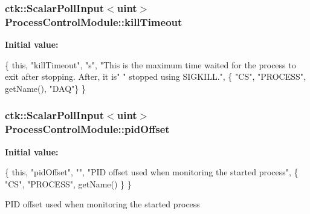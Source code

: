\subsubsection[{\texorpdfstring{kill\+Timeout}{killTimeout}}]{\setlength{\rightskip}{0pt plus 5cm}ctk\+::\+Scalar\+Poll\+Input$<$uint$>$ Process\+Control\+Module\+::kill\+Timeout}\hypertarget{structProcessControlModule_a2e5d8104b93bbd907f61c2e945affb91}{}\label{structProcessControlModule_a2e5d8104b93bbd907f61c2e945affb91}
{\bfseries Initial value\+:}
\begin{DoxyCode}
\{ \textcolor{keyword}{this}, \textcolor{stringliteral}{"killTimeout"}, \textcolor{stringliteral}{"s"}, \textcolor{stringliteral}{"This is the maximum time waited for the process to exit after stopping. After,
       it is"}
        \textcolor{stringliteral}{" stopped using SIGKILL."},
    \{ \textcolor{stringliteral}{"CS"}, \textcolor{stringliteral}{"PROCESS"}, getName(), \textcolor{stringliteral}{"DAQ"}\} \}
\end{DoxyCode}
\subsubsection[{\texorpdfstring{pid\+Offset}{pidOffset}}]{\setlength{\rightskip}{0pt plus 5cm}ctk\+::\+Scalar\+Poll\+Input$<$uint$>$ Process\+Control\+Module\+::pid\+Offset}\hypertarget{structProcessControlModule_a9a3ef4d12ac2b4794154ed091b655796}{}\label{structProcessControlModule_a9a3ef4d12ac2b4794154ed091b655796}
{\bfseries Initial value\+:}
\begin{DoxyCode}
\{ \textcolor{keyword}{this}, \textcolor{stringliteral}{"pidOffset"}, \textcolor{stringliteral}{""}, \textcolor{stringliteral}{"PID offset used when monitoring the started process"},
    \{ \textcolor{stringliteral}{"CS"}, \textcolor{stringliteral}{"PROCESS"}, getName() \} \}
\end{DoxyCode}
P\+ID offset used when monitoring the started process 
